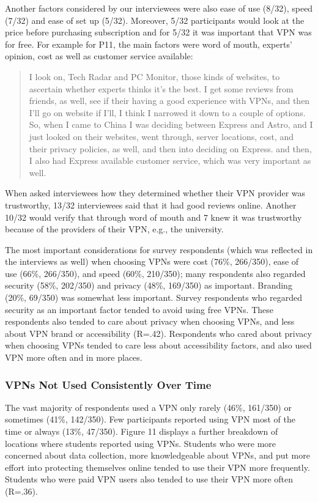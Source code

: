 Another factors considered by our interviewees were also
ease of use (8/32), speed (7/32) and ease of set up (5/32). Moreover, 5/32 participants
would look at the price before purchasing subscription and for 5/32 it was
important that VPN was for free. For example for P11, the main factors were word of mouth, experts’ opinion,
cost as well as customer service available: \begin{quote} I look
    on, Tech Radar and PC Monitor, those kinds of websites, to ascertain
    whether experts thinks it's the best. I get some reviews from friends, as
    well, see if their having a good experience with VPNs, and then I'll go on
    website if I'll, I think I narrowed it down to a couple of
    options. So, when I came to China I was deciding between Express and
    Astro, and I just looked on their websites, went through, server
    locations, cost, and their privacy policies, as well, and then into
    deciding on Express. and then, I also had Express available
customer service, which was very important as well.\end{quote}

When asked interviewees how they determined whether
their VPN provider was trustworthy, 13/32 interviewees said that it had
good reviews online. Another 10/32 would verify that through word of mouth and 7
knew it was trustworthy because of the providers of their VPN, e.g., the
university. 

The most important considerations for survey respondents (which was reflected in the interviews as well) when choosing VPNs
were cost (76\%, 266/350), ease of use (66\%, 266/350), and speed (60\%,
210/350); many respondents also regarded security (58\%, 202/350) and privacy
(48\%, 169/350) as important. Branding (20\%, 69/350) was somewhat less
important. Survey respondents who regarded security as an important factor tended to avoid using
free VPNs. These respondents also tended to care about privacy when choosing
VPNs, and less about VPN brand or accessibility (R=.42). Respondents who cared
about privacy when choosing VPNs tended to care less about accessibility
factors, and also used VPN more often and in more places. 

\subsubsection{VPNs Not Used Consistently Over Time}

The vast majority of respondents used a VPN only rarely (46\%, 161/350) or
sometimes (41\%, 142/350). Few participants reported using VPN most of the
time or always (13\%, 47/350). Figure 11 displays a further breakdown of
locations where students reported using VPNs. Students who were more concerned
about data collection, more knowledgeable about VPNs, and put more effort into
protecting themselves online tended to use their VPN more frequently. Students
who were paid VPN users also tended to use their VPN more often (R=.36).

